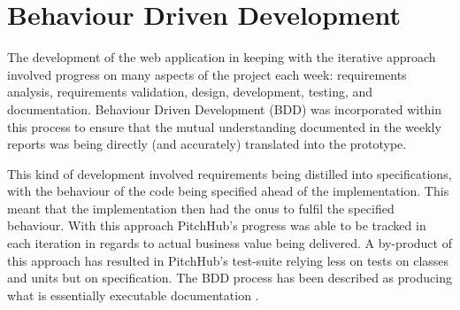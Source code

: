 \section{Behaviour Driven Development}
The development of the web application in keeping with the iterative approach involved progress on many aspects of the project each week: requirements analysis, requirements validation, design, development, testing, and documentation.
Behaviour Driven Development (BDD) was incorporated within this process to ensure that the mutual understanding documented in the weekly reports was being directly (and accurately) translated into the prototype.
\par
This kind of development involved requirements being distilled into specifications, with the behaviour of the code being specified ahead of the implementation. This meant that the implementation then had the onus to fulfil the specified behaviour. With this approach PitchHub's progress was able to be tracked in each iteration in regards to actual business value being delivered. A by-product of this approach has resulted in PitchHub's test-suite relying less on tests on classes and units but on specification. The BDD process has been described as producing what is essentially executable documentation \cite{astels2006new}.

